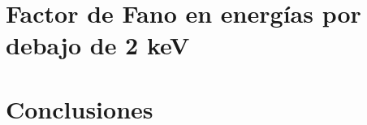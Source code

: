 \documentclass[a4paper,12pt]{report} %
\begin{document}
\chapter{Factor de Fano en energías por debajo de 2 keV} \label{cap:bajaenergia}


\chapter{Conclusiones}\label{conclusiones}

\end{document}
